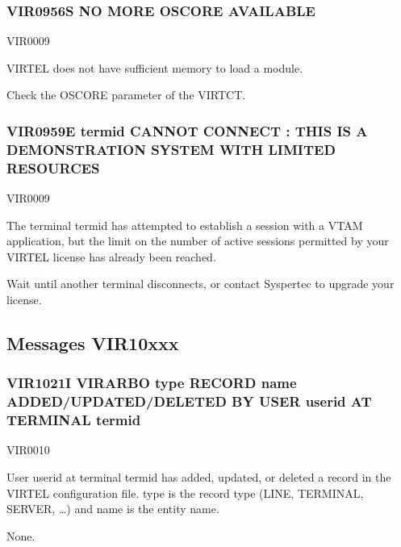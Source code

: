 \documentclass[letterpaper,10pt,english]{sphinxmanual}
\begin{document}
\subsubsection{VIR0956S NO MORE OSCORE AVAILABLE}
\label{\detokenize{messages:vir0956s-no-more-oscore-available}}\begin{description}
\sphinxAtStartPar
VIR0009

\sphinxAtStartPar
VIRTEL does not have sufficient memory to load a module.

\sphinxAtStartPar
Check the OSCORE parameter of the VIRTCT.

\end{description}


\subsubsection{VIR0959E termid CANNOT CONNECT : THIS IS A DEMONSTRATION SYSTEM WITH LIMITED RESOURCES}
\label{\detokenize{messages:vir0959e-termid-cannot-connect-this-is-a-demonstration-system-with-limited-resources}}\begin{description}
\sphinxAtStartPar
VIR0009

\sphinxAtStartPar
The terminal termid has attempted to establish a session with a VTAM application, but the limit on the number of active sessions permitted by your VIRTEL license has already been reached.

\sphinxAtStartPar
Wait until another terminal disconnects, or contact Syspertec to upgrade your license.

\end{description}


\subsection{Messages VIR10xxx}
\label{\detokenize{messages:messages-vir10xxx}}

\subsubsection{VIR1021I VIRARBO type RECORD name ADDED/UPDATED/DELETED BY USER userid AT TERMINAL termid}
\label{\detokenize{messages:vir1021i-virarbo-type-record-name-added-updated-deleted-by-user-userid-at-terminal-termid}}\begin{description}
\sphinxAtStartPar
VIR0010

\sphinxAtStartPar
User userid at terminal termid has added, updated, or deleted a record in the VIRTEL configuration file. type is the record type (LINE, TERMINAL, SERVER, …) and name is the entity name.

\sphinxAtStartPar
None.

\end{description}
\end{document}
